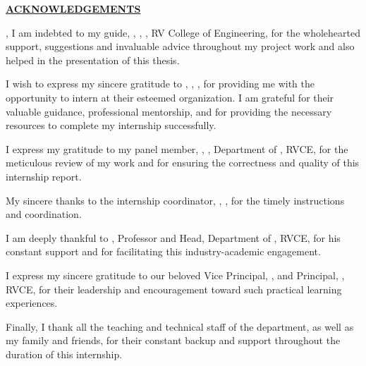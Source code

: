 \thispagestyle{empty}
\begin{center}
	\Large\textbf{\underline{ACKNOWLEDGEMENTS}} \par
\end{center}, 
I am indebted to my guide, \textbf{\printGuideNameA}, \printGuideDesigA, \printGuideDeptAInLF, RV College of Engineering, for the wholehearted support, suggestions and invaluable advice throughout my project work and also helped in the presentation of this thesis.

I wish to express my sincere gratitude to \textbf{\printGuideNameB}, \printGuideDesigB, \printGuideOrgB, for providing me with the opportunity to intern at their esteemed organization. I am grateful for their valuable guidance, professional mentorship, and for providing the necessary resources to complete my internship successfully.

I express my gratitude to my panel member, \textbf{\printPanelMemberA}, \printPanelMemberDesigA, Department of \printPanelMemberDeptAInSF, RVCE, for the meticulous review of my work and for ensuring the correctness and quality of this internship report.

My sincere thanks to the internship coordinator, \textbf{\printInternMemberA}, \printInternMemberDesigA, \printInternMemberDeptAInSF\;for the timely instructions and coordination. 

I am deeply thankful to \textbf{\printHOD}, Professor and Head, Department of \printDepartmentLF, RVCE, for his constant support and for facilitating this industry-academic engagement.

I express my sincere gratitude to our beloved Vice Principal, \textbf{\printVicePrincipal}, and Principal, \textbf{\printPrincipal}, RVCE, for their leadership and encouragement toward such practical learning experiences.

Finally, I thank all the teaching and technical staff of the \printDepartmentLF department, as well as my family and friends, for their constant backup and support throughout the duration of this internship.
